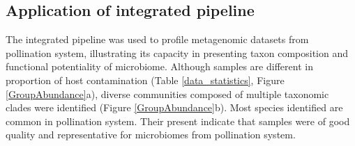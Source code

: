 \documentclass[11pt]{article}
\begin{document}
    \subsection{Application of integrated pipeline}
    The integrated pipeline was used to profile metagenomic datasets from pollination system, illustrating its capacity in presenting taxon composition and functional potentiality of microbiome. 
    Although samples are different in proportion of host contamination (Table \ref{data_statistics}, Figure \ref{GroupAbundance}a), diverse communities composed of multiple taxonomic clades were identified (Figure \ref{GroupAbundance}b). 
    Most species identified are common in pollination system. 
    Their present indicate that samples were of good quality and representative for microbiomes from pollination system. 
\end{document}
